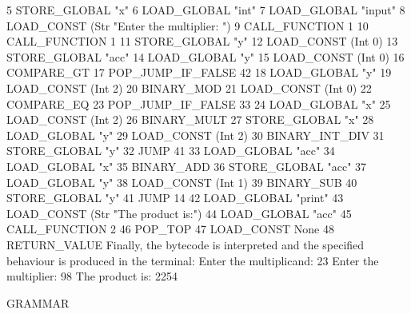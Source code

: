 5        STORE\_GLOBAL             "x"
6        LOAD\_GLOBAL              "int"
7        LOAD\_GLOBAL              "input"
8        LOAD\_CONST               (Str "Enter the multiplier: ")
9        CALL\_FUNCTION            1
10       CALL\_FUNCTION            1
11       STORE\_GLOBAL             "y"
12       LOAD\_CONST               (Int 0)
13       STORE\_GLOBAL             "acc"
14       LOAD\_GLOBAL              "y"
15       LOAD\_CONST               (Int 0)
16       COMPARE\_GT
17       POP\_JUMP\_IF\_FALSE        42
18       LOAD\_GLOBAL              "y"
19       LOAD\_CONST               (Int 2)
20       BINARY\_MOD
21       LOAD\_CONST               (Int 0)
22       COMPARE\_EQ
23       POP\_JUMP\_IF\_FALSE        33
24       LOAD\_GLOBAL              "x"
25       LOAD\_CONST               (Int 2)
26       BINARY\_MULT
27       STORE\_GLOBAL             "x"
28       LOAD\_GLOBAL              "y"
29       LOAD\_CONST               (Int 2)
30       BINARY\_INT\_DIV
31       STORE\_GLOBAL             "y"
32       JUMP                     41
33       LOAD\_GLOBAL              "acc"
34       LOAD\_GLOBAL              "x"
35       BINARY\_ADD
36       STORE\_GLOBAL             "acc"
37       LOAD\_GLOBAL              "y"
38       LOAD\_CONST               (Int 1)
39       BINARY\_SUB
40       STORE\_GLOBAL             "y"
41       JUMP                     14
42       LOAD\_GLOBAL              "print"
43       LOAD\_CONST               (Str "The product is:")
44       LOAD\_GLOBAL              "acc"
45       CALL\_FUNCTION            2
46       POP\_TOP
47       LOAD\_CONST               None
48       RETURN\_VALUE
\endcode
Finally, the bytecode is interpreted and the specified behaviour is produced in the terminal:
\begincode
Enter the multiplicand: 23
Enter the multiplier: 98
The product is: 2254
\endcode

\advsect GRAMMAR


